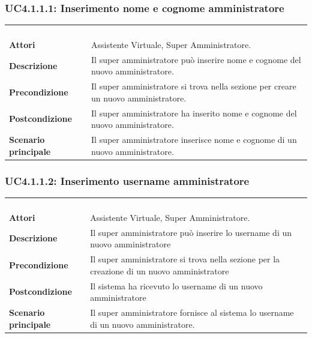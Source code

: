 \newpage\subsubsection{UC4.1.1.1: Inserimento nome e cognome amministratore}
\label{UC4.1.1.1}
\begin{longtable}{l|p{10cm}}
	\rowcolor[gray]{0.8} \multicolumn{2}{c}{} \\
	\rowcolor[gray]{0.8} \multicolumn{2}{c}{\textbf{UC4.1.1.1 - Inserimento nome e cognome amministratore}} \\
	\rowcolor[gray]{0.8} \multicolumn{2}{c}{} \\
	\hline
	&\\
	\textbf{Attori} & Assistente Virtuale, Super Amministratore.\\[7pt]
	\textbf{Descrizione} & Il super amministratore può inserire nome e cognome del nuovo amministratore.\\[7pt]
	\textbf{Precondizione} & Il super amministratore si trova nella sezione per creare un nuovo amministratore. \\[7pt]
	\textbf{Postcondizione} & Il super amministratore ha inserito nome e cognome del nuovo amministratore.\\[7pt]
	\textbf{Scenario principale} &Il super amministratore inserisce nome e cognome di un nuovo amministratore.\\[7pt]\hline
\end{longtable}

\subsubsection{UC4.1.1.2: Inserimento username amministratore}
\label{UC4.1.1.2}
\begin{longtable}{l|p{10cm}}
	\rowcolor[gray]{0.8} \multicolumn{2}{c}{} \\
	\rowcolor[gray]{0.8} \multicolumn{2}{c}{\textbf{UC4.1.1.2 - Inserimento username amministratore}} \\
	\rowcolor[gray]{0.8} \multicolumn{2}{c}{} \\
	\hline
	&\\
	\textbf{Attori} & Assistente Virtuale, Super Amministratore.\\[7pt]
	\textbf{Descrizione} & Il super amministratore può inserire lo username di un nuovo amministratore\\[7pt]
	\textbf{Precondizione} & Il super amministratore si trova nella sezione per la creazione di un nuovo amministratore\\[7pt]
	\textbf{Postcondizione} & Il sistema ha ricevuto lo username di un nuovo amministratore\\[7pt]
	\textbf{Scenario principale} &Il super amministratore fornisce al sistema lo username di un nuovo amministratore.\\[7pt]\hline
\end{longtable}

